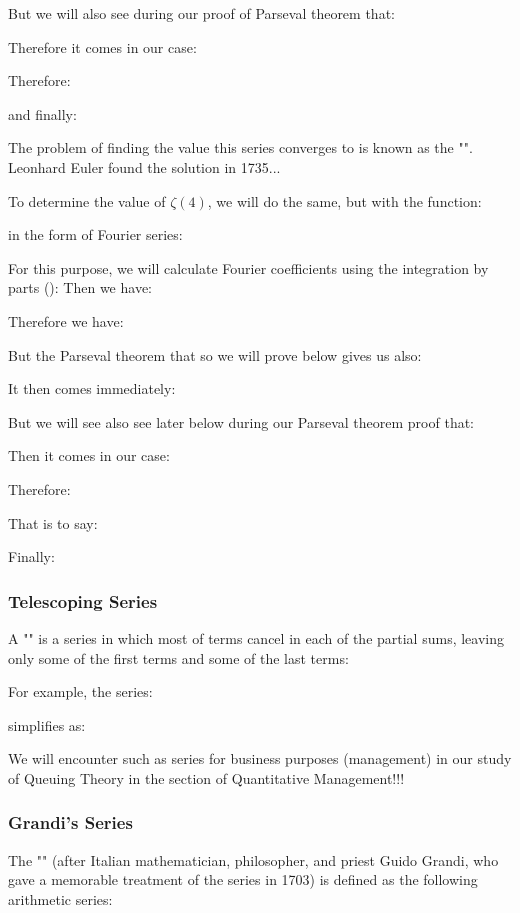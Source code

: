 	But we will also see during our proof of Parseval theorem that:
	
	Therefore it comes in our case:
	
	Therefore:
	
	and finally:
	
	The problem of finding the value this series converges to is known as the "". Leonhard Euler found the solution in 1735...
	
	To determine the value of $\zeta(4)$, we will do the same, but with the function:
	
	in the form of Fourier series:
	
	For this purpose, we will calculate Fourier coefficients using the integration by parts ():
	Then we have:
	
	Therefore we have:
	
	But the Parseval theorem that so we will prove below gives us also:
	
	It then comes immediately:
	
	But we will see also see later below during our Parseval theorem proof that:
	
	Then it comes in our case:
	
	Therefore:
	
	That is to say:
	
	Finally:
	
	
	\subsubsection{Telescoping Series}
	A "" is a series in which most of terms cancel in each of the partial sums, leaving only some of the first terms and some of the last terms:
	
	For example, the series:
	
	simplifies as:
	
	We will encounter such as series for business purposes (management) in our study of Queuing Theory in the section of Quantitative Management!!!
	
	\subsubsection{Grandi's Series}
	The "" (after Italian mathematician, philosopher, and priest Guido Grandi, who gave a memorable treatment of the series in 1703) is defined as the following arithmetic series:
	
